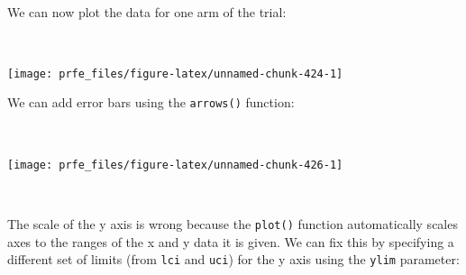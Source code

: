 \documentclass[12pt,a4paper]{book}
\newenvironment{Shaded}{\begin{snugshade}}{\end{snugshade}}
\newcommand{\KeywordTok}[1]{\textcolor[rgb]{0.13,0.29,0.53}{\textbf{#1}}}
\newcommand{\DataTypeTok}[1]{\textcolor[rgb]{0.13,0.29,0.53}{#1}}
\newcommand{\DecValTok}[1]{\textcolor[rgb]{0.00,0.00,0.81}{#1}}
\newcommand{\FloatTok}[1]{\textcolor[rgb]{0.00,0.00,0.81}{#1}}
\newcommand{\StringTok}[1]{\textcolor[rgb]{0.31,0.60,0.02}{#1}}
\newcommand{\OperatorTok}[1]{\textcolor[rgb]{0.81,0.36,0.00}{\textbf{#1}}}
\newcommand{\NormalTok}[1]{#1}
\theoremstyle{definition}
\theoremstyle{definition}
\theoremstyle{definition}
\theoremstyle{remark}
\begin{document}
~

We can now plot the data for one arm of the trial:

~

\begin{Shaded}
\end{Shaded}

\begin{center}\texttt{[image: prfe\_files/figure-latex/unnamed-chunk-424-1]} \end{center}

\newpage

We can add error bars using the \texttt{arrows()} function:

~

\begin{Shaded}
\end{Shaded}

\begin{center}\texttt{[image: prfe\_files/figure-latex/unnamed-chunk-426-1]} \end{center}

~

The scale of the y axis is wrong because the \texttt{plot()} function
automatically scales axes to the ranges of the x and y data it is given.
We can fix this by specifying a different set of limits (from
\texttt{lci} and \texttt{uci}) for the y axis using the \texttt{ylim}
parameter:

~

\begin{Shaded}
\end{Shaded}
\end{document}
